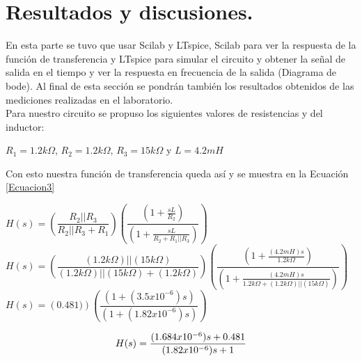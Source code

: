 \documentclass[12pt,a4paper]{article}
\newcounter{ns}
\begin{document}
\section{Resultados y discusiones.}
En esta parte se tuvo que usar Scilab y LTspice, Scilab para ver la respuesta de la función de transferencia y LTspice para simular el circuito y obtener la señal de salida en el tiempo y ver la respuesta en frecuencia de la salida (Diagrama de bode). Al final de esta sección se pondrán también los resultados obtenidos de las mediciones realizadas en el laboratorio.\\[12pt]
Para nuestro circuito se propuso los siguientes valores de resistencias y del inductor:\\
\begin{center}
$R_{1}=1.2k\Omega$, $R_{2}=1.2k\Omega$, $R_{3}=15k\Omega$ y $L=4.2mH$
\end{center}
Con esto nuestra función de transferencia queda así y se muestra en la Ecuación \ref{Ecuacion3}\\
\begin{center}
$H(s)=\left(\dfrac{R_{2}||R_{3}}{R_{2}||R_{3}+R_{1}}\right)\left(\dfrac{(1+\frac{sL}{R_{2}})}{(1+\frac{sL}{R_{2}+R_{1}||R_{3}})}\right)$\\[12pt]
$H(s)=\left(\dfrac{(1.2k\Omega)||(15k\Omega)}{(1.2k\Omega)||(15k\Omega)+(1.2k\Omega)}\right)\left(\dfrac{(1+\frac{(4.2mH)s}{1.2k\Omega})}{(1+\frac{(4.2mH)s}{1.2k\Omega+(1.2k\Omega)||(15k\Omega)})}\right)$\\[12pt]
$H(s)=\left(0.481)\right)\left(\dfrac{(1+(3.5x10^{-6})s)}{(1+(1.82x10^{-6})s)}\right)$
\end{center}
\begin{equation}
\centering
H(s)=\dfrac{(1.684x10^{-6})s+0.481}{(1.82x10^{-6})s+1}
\label{Ecuacion3}
\end{equation}
\end{document}
